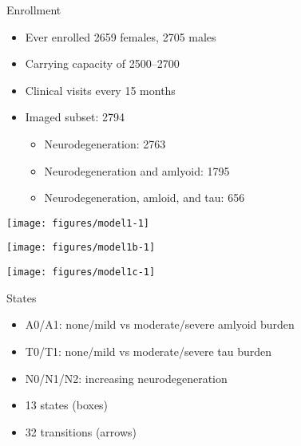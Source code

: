 \begin{frame}{Enrollment}
  \begin{itemize}
    \item Ever enrolled 2659 females, 
      2705 males
    \item Carrying capacity of 2500--2700
    \item Clinical visits every 15 months
    \item Imaged subset: 2794
      \begin{itemize}
        \item Neurodegeneration: 2763
        \item Neurodegeneration and amlyoid: 1795
        \item Neurodegeneration, amloid, and tau: 656
      \end{itemize}
  \end{itemize}
\end{frame}

\begin{frame}
\begin{knitrout}
\color{fgcolor}
\texttt{[image: figures/model1-1]} 

\end{knitrout}
\end{frame}

\begin{frame}
\begin{knitrout}
\color{fgcolor}
\texttt{[image: figures/model1b-1]} 

\end{knitrout}
\end{frame}

\begin{frame}
\begin{knitrout}
\color{fgcolor}
\texttt{[image: figures/model1c-1]} 

\end{knitrout}
\end{frame}

\begin{frame}{States}
  \begin{itemize}
    \item A0/A1: none/mild vs moderate/severe amlyoid burden
    \item T0/T1: none/mild vs moderate/severe tau burden
    \item N0/N1/N2: increasing neurodegeneration
    \item 13 states (boxes)
    \item 32 transitions (arrows)
  \end{itemize}
\end{frame}

